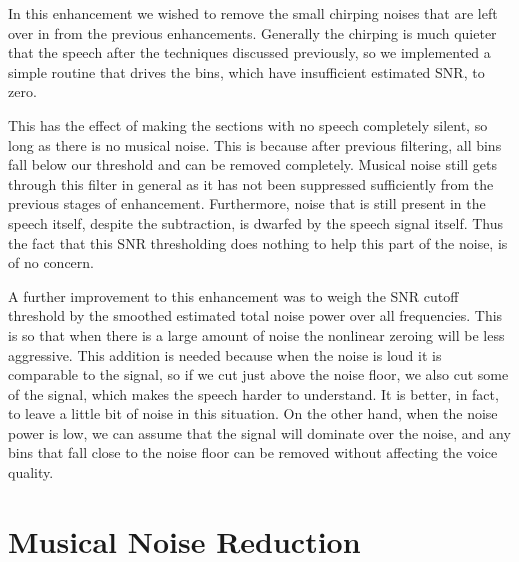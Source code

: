 \documentclass[11pt]{article} %
\begin{document}
{In this enhancement we wished to remove the small chirping noises that are left over in from the previous enhancements. Generally the chirping is much quieter that the speech after the techniques discussed previously, so we implemented a simple routine that drives the bins, which have insufficient estimated SNR, to zero.

This has the effect of making the sections with no speech completely silent, so long as there is no musical noise. This is because after previous filtering, all bins fall below our threshold and can be removed completely. Musical noise still gets through this filter in general as it has not been suppressed sufficiently from the previous stages of enhancement. Furthermore, noise that is still present in the speech itself, despite the subtraction, is dwarfed by the speech signal itself. Thus the fact that this SNR thresholding does nothing to help this part of the noise, is of no concern.

A further improvement to this enhancement was to weigh the SNR cutoff threshold by the smoothed estimated total noise power over all frequencies. This is so that  when there is a large amount of noise the nonlinear zeroing will be less aggressive.
This addition is needed because when the noise is loud it is comparable to the signal, so if we cut just above the noise floor, we also cut some of the signal, which makes the speech harder to understand. It is better, in fact, to leave a little bit of noise in this situation. On the other hand, when the noise power is low, we can assume that the signal will dominate over the noise, and any bins that fall close to the noise floor can be removed without affecting the voice quality.


\section{Musical Noise Reduction} 
\label{sec:musicalNoise}

}
\end{document}
